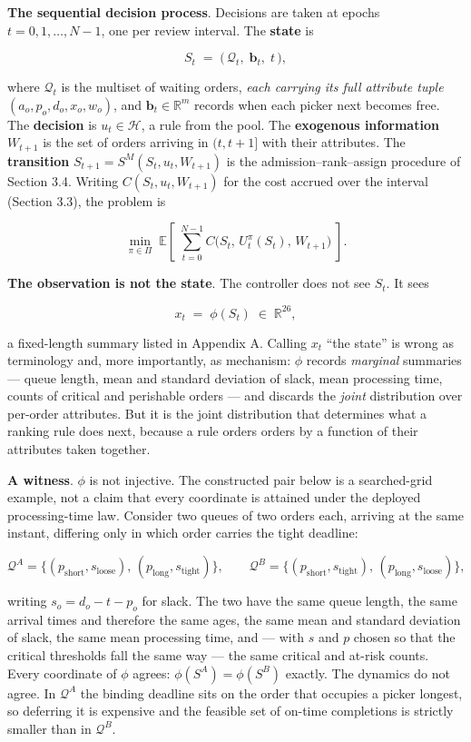 \documentclass[review,3p,times]{elsarticle}
\theoremstyle{definition}
\begin{document}
\textbf{The sequential decision process}. Decisions are taken at epochs
\(t = 0, 1, \dots, N-1\), one per review interval. The \textbf{state} is

\[ S_t \;=\; \big(\, \mathcal{Q}_t,\; \mathbf{b}_t,\; t \,\big), \]

where \(\mathcal{Q}_t\) is the multiset of waiting orders, \emph{each
carrying its full attribute tuple} \((a_o, p_o, d_o, x_o, w_o)\), and
\(\mathbf{b}_t \in \mathbb{R}^m\) records when each picker next becomes
free. The \textbf{decision} is \(u_t \in \mathcal{H}\), a rule from the
pool. The \textbf{exogenous information} \(W_{t+1}\) is the set of
orders arriving in \((t, t+1]\) with their attributes. The
\textbf{transition} \(S_{t+1} = S^M(S_t, u_t, W_{t+1})\) is the
admission--rank--assign procedure of Section 3.4. Writing
\(C(S_t, u_t, W_{t+1})\) for the cost accrued over the interval (Section
3.3), the problem is

\[ \min_{\pi \in \Pi} \; \mathbb{E}\left[\; \sum_{t=0}^{N-1} C\big(S_t,\, U^\pi_t(S_t),\, W_{t+1}\big) \;\right] . \]

\textbf{The observation is not the state}. The controller does not see
\(S_t\). It sees

\[ x_t \;=\; \phi(S_t) \;\in\; \mathbb{R}^{26}, \]

a fixed-length summary listed in Appendix A. Calling \(x_t\) ``the
state'' is wrong as terminology and, more importantly, as mechanism:
\(\phi\) records \emph{marginal} summaries --- queue length, mean and
standard deviation of slack, mean processing time, counts of critical
and perishable orders --- and discards the \emph{joint} distribution
over per-order attributes. But it is the joint distribution that
determines what a ranking rule does next, because a rule orders orders
by a function of their attributes taken together.

\textbf{A witness}. \(\phi\) is not injective. The constructed pair
below is a searched-grid example, not a claim that every coordinate is
attained under the deployed processing-time law. Consider two queues of
two orders each, arriving at the same instant, differing only in which
order carries the tight deadline:

\[ \mathcal{Q}^{A} = \{(p_{\text{short}}, s_{\text{loose}}),\, (p_{\text{long}}, s_{\text{tight}})\}, \qquad \mathcal{Q}^{B} = \{(p_{\text{short}}, s_{\text{tight}}),\, (p_{\text{long}}, s_{\text{loose}})\}, \]

writing \(s_o = d_o - t - p_o\) for slack. The two have the same queue
length, the same arrival times and therefore the same ages, the same
mean and standard deviation of slack, the same mean processing time, and
--- with \(s\) and \(p\) chosen so that the critical thresholds fall the
same way --- the same critical and at-risk counts. Every coordinate of
\(\phi\) agrees: \(\phi(S^A) = \phi(S^B)\) exactly. The dynamics do not
agree. In \(\mathcal{Q}^{A}\) the binding deadline sits on the order
that occupies a picker longest, so deferring it is expensive and the
feasible set of on-time completions is strictly smaller than in
\(\mathcal{Q}^{B}\).
\end{document}

